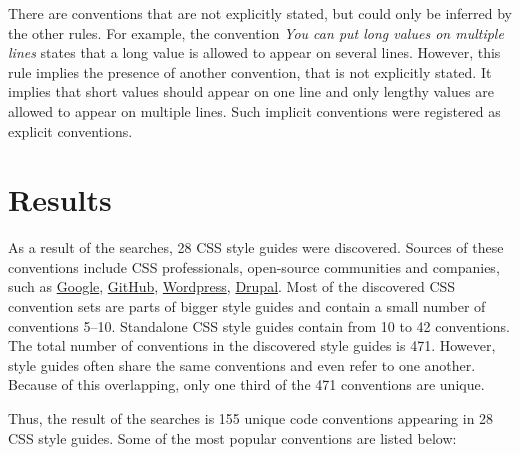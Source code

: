 There are conventions that are not explicitly stated, but could only be
inferred by the other rules. For example, the convention \textit{You can put
long values on multiple lines} states that a long value is allowed to appear
on several lines. However, this rule implies the presence of another
convention, that is not explicitly stated. It implies that short values should
appear on one line and only lengthy values are allowed to appear on multiple lines.
Such implicit conventions were registered as explicit conventions.

\section{Results}

As a result of the searches, 28 CSS style guides were discovered. Sources of
these conventions include CSS professionals, open-source communities and
companies, such as
\href{https://google-styleguide.googlecode.com/svn/trunk/htmlcssguide.xml#Protocol}{Google},
\href{http://primercss.io/guidelines/#css}{GitHub},
\href{https://make.wordpress.org/core/handbook/best-practices/coding-standards/css/}{Wordpress},
\href{https://www.drupal.org/node/1887862}{Drupal}. Most of the discovered CSS
convention sets are parts of bigger style guides and contain a
small number of conventions 5--10. Standalone CSS style guides contain from 10
to 42 conventions. The total number of conventions in the discovered style
guides is 471. However, style guides often share the same conventions and even
refer to one another. Because of this overlapping, only one third of the 471
conventions are unique.

Thus, the result of the searches is 155 unique code conventions appearing in
28 CSS style guides. Some of the most popular conventions are listed below:

